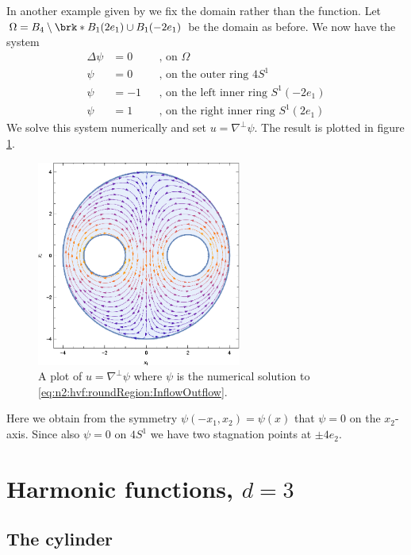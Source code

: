In another example given by \cite{Wahlen2023} we fix the domain rather than the function.
Let $\Omega=B_4\setminus\brk*{B_1(2e_1)\cup B_1(-2e_1)}$ be the domain as before.
We now have the system
\begin{equation}
  \begin{aligned}
    \Delta \psi&=0 &&\text{, on }\Omega \\
    \psi&=0 &&\text{, on the outer ring }4S^1 \\
    \psi&=-1 &&\text{, on the left inner ring }S^1(-2e_1) \\
    \psi&=1 &&\text{, on the right inner ring }S^1(2e_1)
  \end{aligned}\label{eq:n2:hvf:roundRegion:InflowOutflow}
\end{equation}
We solve this system numerically and set $u=\nabla^\perp\psi$.
The result is plotted in figure \ref{pl:n2_hvf_roundRegion_InflowOutflow}.
\begin{figure}
  \centering
  \includegraphics[width=0.6\textwidth]{../Plots/HarmonicVectorFields_gr5.eps}
  \caption{A plot of $u=\nabla^\perp\psi$ where $\psi$ is the numerical solution to
   \eqref{eq:n2:hvf:roundRegion:InflowOutflow}.}
  \label{pl:n2_hvf_roundRegion_InflowOutflow}
\end{figure}
Here we obtain from the symmetry $\psi(-x_1,x_2)=\psi(x)$ that $\psi=0$ on
the $x_2$-axis. Since also $\psi=0$ on $4S^1$ we have two stagnation points
at $\pm4e_2$.

\chapter{Harmonic functions, $d=3$}

\section{The cylinder}

